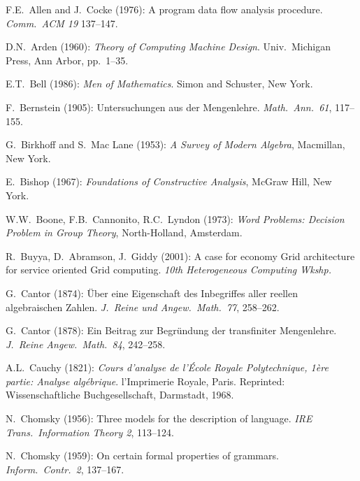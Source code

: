 
\begin{thebibliography}{999}


F.E.~Allen and J.~Cocke (1976): A program data flow analysis
procedure.  {\it Comm.~ACM 19} 137--147.

D.N.~Arden (1960):
{\it Theory of Computing Machine Design}.
Univ.~Michigan Press, Ann Arbor, pp.~1--35.


E.T.~Bell (1986):
{\it Men of Mathematics}.
Simon and Schuster, New York.

F.~Bernstein (1905): Untersuchungen aus der Mengenlehre. {\it
Math.~Ann.~61}, 117--155.

G.~Birkhoff and S.~Mac Lane (1953): {\it A Survey of Modern Algebra},
Macmillan, New York.

E.~Bishop (1967): {\it Foundations of Constructive Analysis},
McGraw Hill, New York.

W.W.~Boone, F.B.~Cannonito, R.C.~Lyndon (1973):
{\it Word Problems: Decision Problem in Group Theory}, North-Holland,
Amsterdam.

R.~Buyya, D.~Abramson, J.~Giddy (2001): A case for economy Grid
architecture for service oriented Grid computing.  {\it 10th
Heterogeneous Computing Wkshp.}


G.~Cantor (1874): \"{U}ber eine Eigenschaft des Inbegriffes aller
reellen algebraischen Zahlen.  {\it J.~Reine und Angew.~Math.~77},
258--262.

G.~Cantor (1878): Ein Beitrag zur Begr\"{u}ndung der transfiniter
Mengenlehre.  {\it J.~Reine Angew.~Math.~84}, 242--258.

A.L.~Cauchy (1821): {\it Cours d'analyse de l'\'{E}cole Royale
Polytechnique, 1\`{e}re partie: Analyse alg\'{e}brique}.
l'Imprimerie Royale, Paris.  Reprinted: Wissenschaftliche
Buchgesellschaft, Darmstadt, 1968.

N.~Chomsky (1956): Three models for the description of language.
{\it IRE Trans.~Information Theory 2}, 113--124.

N.~Chomsky (1959): On certain formal properties of grammars.  {\it
Inform.~Contr.~2}, 137--167.


\end{thebibliography}
